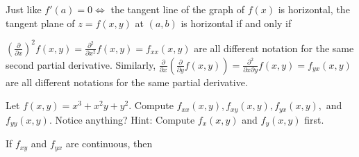 \documentclass[12pt, a4paper]{article}
\begin{document}
\begin{thrm}
  Just like \(f'(a) = 0 \iff \) the tangent line of the graph of
  \(f(x)\) is horizontal, the tangent plane of \(z=f(x,y)\) at
  \((a,b)\) is horizontal if and only if 
\end{thrm}
\begin{defi}
  \(\left(\frac{\partial}{\partial x}\right)^2 f(x,y) =
  \frac{\partial^2}{\partial x^2} f(x,y) = f_{xx}(x,y)\) are
  all different notation for the same second partial derivative. Similarly,
  \(\frac{\partial}{\partial x}\left( \frac{\partial}{\partial y}
    f(x,y) \right) = \frac{\partial^2}{\partial x \partial y} f(x,y) =
  f_{yx}(x,y)\) are all different notations for the same partial derivative.
\end{defi}
\begin{ex}
  Let \(f(x,y) = x^3 + x^2 y + y^2\). Compute \(f_{xx}(x,y),
  f_{xy}(x,y), f_{yx}(x,y), \) and \(f_{yy}(x,y)\). Notice anything?
  Hint: Compute 
  \(f_x(x,y)\) and \(f_y(x,y)\) first. 
\end{ex}
\begin{thrm}
  If \(f_{xy}\) and \(f_{yx}\) are continuous, then 
\end{thrm}
\end{document}

